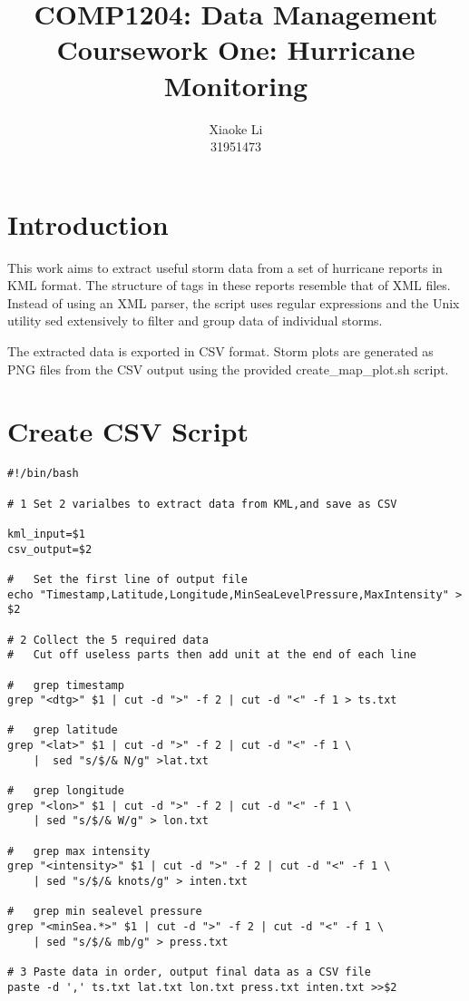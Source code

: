 \documentclass[]{article}
\title{COMP1204: Data Management \\ Coursework One: Hurricane Monitoring }
\author{Xiaoke Li \\ 31951473}
\begin{document}
\maketitle

\section{Introduction}
This work aims to extract useful storm data from a set of hurricane reports in KML format.
The structure of tags in these reports resemble that of XML files.
Instead of using an XML parser, the script uses regular expressions and
the Unix utility sed extensively to filter and group data of individual storms.

{\parskip=7pt
The extracted data is exported in CSV format. Storm plots are generated as PNG files
from the CSV output using the provided create\_map\_plot.sh script.}

\section{Create CSV Script}

\begin{verbatim}
#!/bin/bash

# 1 Set 2 varialbes to extract data from KML,and save as CSV

kml_input=$1
csv_output=$2

#   Set the first line of output file
echo "Timestamp,Latitude,Longitude,MinSeaLevelPressure,MaxIntensity" > $2

# 2 Collect the 5 required data
# 	Cut off useless parts then add unit at the end of each line

#   grep timestamp
grep "<dtg>" $1 | cut -d ">" -f 2 | cut -d "<" -f 1 > ts.txt

#   grep latitude
grep "<lat>" $1 | cut -d ">" -f 2 | cut -d "<" -f 1 \
    |  sed "s/$/& N/g" >lat.txt

#   grep longitude
grep "<lon>" $1 | cut -d ">" -f 2 | cut -d "<" -f 1 \
    | sed "s/$/& W/g" > lon.txt

#   grep max intensity
grep "<intensity>" $1 | cut -d ">" -f 2 | cut -d "<" -f 1 \
    | sed "s/$/& knots/g" > inten.txt

#   grep min sealevel pressure
grep "<minSea.*>" $1 | cut -d ">" -f 2 | cut -d "<" -f 1 \
    | sed "s/$/& mb/g" > press.txt

# 3 Paste data in order, output final data as a CSV file
paste -d ',' ts.txt lat.txt lon.txt press.txt inten.txt >>$2
\end{verbatim}
\end{document}
